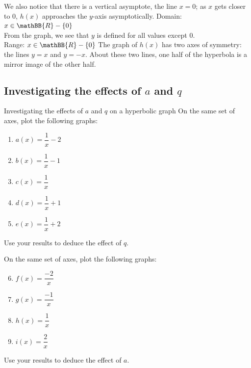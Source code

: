 \begin{wex}
{We also notice that there is a vertical asymptote, the line $x=0$; as $x$ gets closer to $0$, $h(x)$ approaches the $y$-axis asymptotically.
Domain: $x \in \mathBB{R} - \{0\}$\\
From the graph, we see that $y$ is defined for all values except $0$.\\
Range: $x \in \mathBB{R} - \{0\}$ 
The graph of $h(x)$ has two axes of symmetry: the lines $y=x$ and $y=-x$. About these two lines, one half of the hyperbola is a mirror image of the other half. 
}
\end{wex}




\subsection*{Investigating the effects of $a$ and $q$ }
\begin{Investigation}{Investigating the effects of $a$ and $q$ on a hyperbolic graph}
 On the same set of axes, plot the following graphs:
    \begin{enumerate}[itemsep=3pt, label=\textbf{\arabic*}. ] 
    \item $a(x)=\dfrac{1}{x}-2$
    \item $b(x)=\dfrac{1}{x}-1$
    \item $c(x)=\dfrac{1}{x}$
    \item $d(x)=\dfrac{1}{x}+1$
    \item $e(x)=\dfrac{1}{x}+2$
\end{enumerate}
Use your results to deduce the effect of $q$.\par

On the same set of axes, plot the following graphs:
    \begin{enumerate}[itemsep=3pt, label=\textbf{\arabic*}. ] 
\setcounter{enumi}{5}
    \item $f(x)=\dfrac{-2}{x}$
    \item $g(x)=\dfrac{-1}{x}$
    \item $h(x)=\dfrac{1}{x}$
    \item $i(x)=\dfrac{2}{x}$
    \end{enumerate}
Use your results to deduce the effect of $a$.
\end{Investigation}

